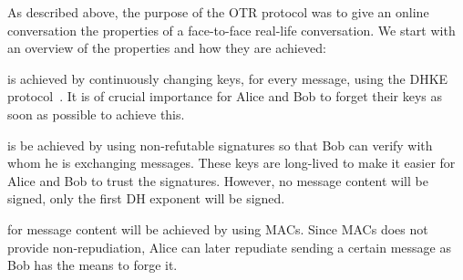 As described above, the purpose of the \ac{OTR} protocol was to give an online 
conversation the properties of a face-to-face real-life conversation.
We start with an overview of the properties and how they are achieved:
\begin{description}
  \item[Perfect forward secrecy] is achieved by continuously changing keys, for 
    every message, using the \ac{DHKE} protocol~\cite{dh}.
    It is of crucial importance for Alice and Bob to forget their keys as soon 
    as possible to achieve this.

  \item[Authentication] is be achieved by using non-refutable signatures so 
    that Bob can verify with whom he is exchanging messages.
    These keys are long-lived to make it easier for Alice and Bob to trust the 
    signatures.
    However, no message content will be signed, only the first \ac{DH} exponent 
    will be signed.

  \item[Integrity and repudiation] for message content will be achieved by 
    using \acp{MAC}.
    Since \acp{MAC} does not provide non-repudiation, Alice can later 
    repudiate sending a certain message as Bob has the means to forge it.


\end{description}
